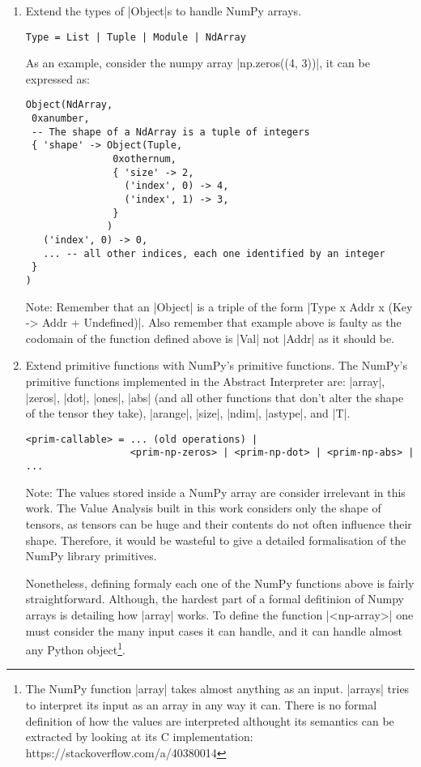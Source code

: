 \begin{enumerate}
\def\labelenumi{\arabic{enumi}.}
\item
  Extend the types of \pycode|Object|s to handle NumPy arrays.

\begin{verbatim}
Type = List | Tuple | Module | NdArray
\end{verbatim}

  As an example, consider the numpy array \pycode|np.zeros((4, 3))|, it
  can be expressed as:

\begin{verbatim}
Object(NdArray,
 0xanumber,
 -- The shape of a NdArray is a tuple of integers
 { 'shape' -> Object(Tuple,
               0xothernum,
               { 'size' -> 2,
                 ('index', 0) -> 4,
                 ('index', 1) -> 3,
               }
              )
   ('index', 0) -> 0,
   ... -- all other indices, each one identified by an integer
 }
)
\end{verbatim}

  Note: Remember that an \pycode|Object| is a triple of the form
  \pycode|Type x Addr x (Key -> Addr + Undefined)|.
  Also remember that example above is faulty as the codomain of the
  function defined above is \pycode|Val| not \pycode|Addr| as it should
  be.
\item
  Extend primitive functions with NumPy's primitive functions. The
  NumPy's primitive functions implemented in the Abstract Interpreter
  are: \pycode|array|, \pycode|zeros|, \pycode|dot|, \pycode|ones|,
  \pycode|abs| (and all other functions that don't alter the shape of
  the tensor they take), \pycode|arange|, \pycode|size|, \pycode|ndim|,
  \pycode|astype|, and \pycode|T|.

\begin{verbatim}
<prim-callable> = ... (old operations) |
                  <prim-np-zeros> | <prim-np-dot> | <prim-np-abs> | ...
\end{verbatim}

  Note: The values stored inside a NumPy array are consider irrelevant
  in this work. The Value Analysis built in this work considers only the
  shape of tensors, as tensors can be huge and their contents do not
  often influence their shape. Therefore, it would be wasteful to give a
  detailed formalisation of the NumPy library primitives.

  Nonetheless, defining formaly each one of the NumPy functions above is
  fairly straightforward. Although, the hardest part of a formal
  defitinion of Numpy arrays is detailing how \pycode|array| works. To
  define the function \pycode|<np-array>| one
  must consider the many input cases it can handle, and it can handle
  almost any Python object\footnote{The NumPy function \pycode|array|
    takes almost anything as an input. \pycode|arrays| tries to
    interpret its input as an array in any way it can. There is no
    formal definition of how the values are interpreted althought its
    semantics can be extracted by looking at its C implementation:
    https://stackoverflow.com/a/40380014}.


\end{enumerate}
